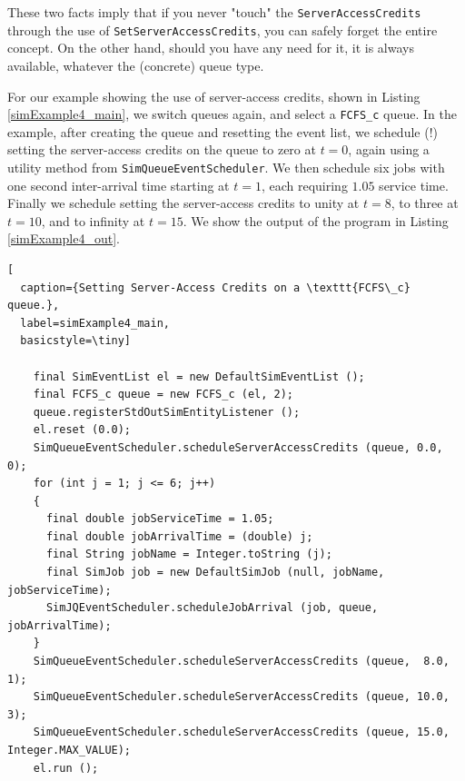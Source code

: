 These two facts imply that
  if you never "touch"
  the \lstinline|ServerAccessCredits|
  through the use of
  \lstinline|SetServerAccessCredits|,
  you can safely forget the entire concept.
On the other hand,
  should you have any need for it,
  it is always available,
  whatever the (concrete) queue type.

For our example showing the use of server-access credits,
  shown in Listing \ref{simExample4_main},
  we switch queues again,
  and select a \lstinline|FCFS_c| queue.
In the example, after creating the queue
  and resetting the event list,
  we schedule (!) setting the server-access credits
  on the queue to zero at $t=0$,
  again using a utility method
  from \lstinline|SimQueueEventScheduler|.
We then schedule six jobs
  with one second inter-arrival time
  starting at $t=1$,
  each requiring $1.05$ service time.
Finally we schedule setting the server-access credits
  to unity at $t=8$,
  to three at $t=10$,
  and to infinity at $t=15$.
We show the output of the program in
  Listing \ref{simExample4_out}.

\begin{lstfloat}
\begin{lstlisting}[
  caption={Setting Server-Access Credits on a \texttt{FCFS\_c} queue.},
  label=simExample4_main,
  basicstyle=\tiny]

    final SimEventList el = new DefaultSimEventList ();
    final FCFS_c queue = new FCFS_c (el, 2);
    queue.registerStdOutSimEntityListener ();
    el.reset (0.0);
    SimQueueEventScheduler.scheduleServerAccessCredits (queue, 0.0, 0);
    for (int j = 1; j <= 6; j++)
    {
      final double jobServiceTime = 1.05;
      final double jobArrivalTime = (double) j;
      final String jobName = Integer.toString (j);
      final SimJob job = new DefaultSimJob (null, jobName, jobServiceTime);
      SimJQEventScheduler.scheduleJobArrival (job, queue, jobArrivalTime);
    }
    SimQueueEventScheduler.scheduleServerAccessCredits (queue,  8.0, 1);
    SimQueueEventScheduler.scheduleServerAccessCredits (queue, 10.0, 3);
    SimQueueEventScheduler.scheduleServerAccessCredits (queue, 15.0, Integer.MAX_VALUE);
    el.run ();

\end{lstlisting}
\end{lstfloat}
  
